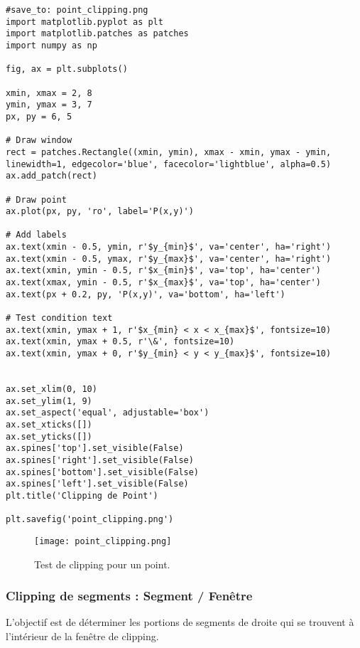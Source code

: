 \documentclass{article}
\begin{document}
\begin{verbatim}
#save_to: point_clipping.png
import matplotlib.pyplot as plt
import matplotlib.patches as patches
import numpy as np

fig, ax = plt.subplots()

xmin, xmax = 2, 8
ymin, ymax = 3, 7
px, py = 6, 5

# Draw window
rect = patches.Rectangle((xmin, ymin), xmax - xmin, ymax - ymin, linewidth=1, edgecolor='blue', facecolor='lightblue', alpha=0.5)
ax.add_patch(rect)

# Draw point
ax.plot(px, py, 'ro', label='P(x,y)')

# Add labels
ax.text(xmin - 0.5, ymin, r'$y_{min}$', va='center', ha='right')
ax.text(xmin - 0.5, ymax, r'$y_{max}$', va='center', ha='right')
ax.text(xmin, ymin - 0.5, r'$x_{min}$', va='top', ha='center')
ax.text(xmax, ymin - 0.5, r'$x_{max}$', va='top', ha='center')
ax.text(px + 0.2, py, 'P(x,y)', va='bottom', ha='left')

# Test condition text
ax.text(xmin, ymax + 1, r'$x_{min} < x < x_{max}$', fontsize=10)
ax.text(xmin, ymax + 0.5, r'\&', fontsize=10)
ax.text(xmin, ymax + 0, r'$y_{min} < y < y_{max}$', fontsize=10)


ax.set_xlim(0, 10)
ax.set_ylim(1, 9)
ax.set_aspect('equal', adjustable='box')
ax.set_xticks([])
ax.set_yticks([])
ax.spines['top'].set_visible(False)
ax.spines['right'].set_visible(False)
ax.spines['bottom'].set_visible(False)
ax.spines['left'].set_visible(False)
plt.title('Clipping de Point')

plt.savefig('point_clipping.png')

\end{verbatim}

\begin{figure}[H]
\centering
\texttt{[image: point\_clipping.png]}
\caption{Test de clipping pour un point.}
\label{fig:point_clipping}
\end{figure}

\subsubsection{Clipping de segments : Segment / Fenêtre}
L'objectif est de déterminer les portions de segments de droite qui se trouvent à l'intérieur de la fenêtre de clipping.
\end{document}
